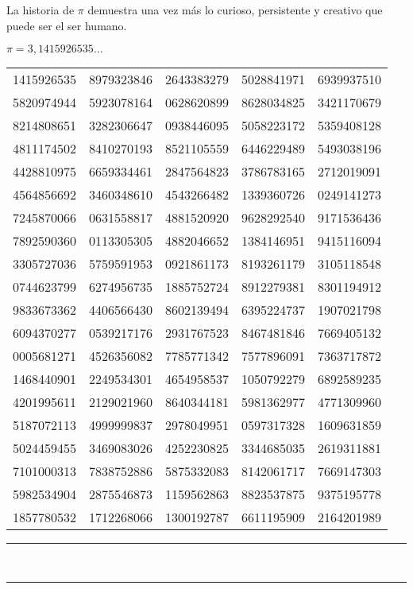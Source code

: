 La historia de $\pi$ demuestra una vez más lo curioso, persistente y creativo que puede ser el ser humano.

\begin{center}
\Large $\pi = 3,1415926535\ldots$
\end{center}

{%
\renewcommand{\arraystretch}{0.9}
\setlength{\tabcolsep}{0.6em}

\begin{center}
\begin{tabular}{ccccc}
1415926535 & 8979323846 & 2643383279 & 5028841971 & 6939937510 \\
5820974944 & 5923078164 & 0628620899 & 8628034825 & 3421170679 \\
8214808651 & 3282306647 & 0938446095 & 5058223172 & 5359408128 \\
4811174502 & 8410270193 & 8521105559 & 6446229489 & 5493038196 \\
4428810975 & 6659334461 & 2847564823 & 3786783165 & 2712019091 \\
4564856692 & 3460348610 & 4543266482 & 1339360726 & 0249141273 \\
7245870066 & 0631558817 & 4881520920 & 9628292540 & 9171536436 \\
7892590360 & 0113305305 & 4882046652 & 1384146951 & 9415116094 \\
3305727036 & 5759591953 & 0921861173 & 8193261179 & 3105118548 \\
0744623799 & 6274956735 & 1885752724 & 8912279381 & 8301194912 \\
9833673362 & 4406566430 & 8602139494 & 6395224737 & 1907021798 \\
6094370277 & 0539217176 & 2931767523 & 8467481846 & 7669405132 \\
0005681271 & 4526356082 & 7785771342 & 7577896091 & 7363717872 \\
1468440901 & 2249534301 & 4654958537 & 1050792279 & 6892589235 \\
4201995611 & 2129021960 & 8640344181 & 5981362977 & 4771309960 \\
5187072113 & 4999999837 & 2978049951 & 0597317328 & 1609631859 \\
5024459455 & 3469083026 & 4252230825 & 3344685035 & 2619311881 \\
7101000313 & 7838752886 & 5875332083 & 8142061717 & 7669147303 \\
5982534904 & 2875546873 & 1159562863 & 8823537875 & 9375195778 \\
1857780532 & 1712268066 & 1300192787 & 6611195909 & 2164201989 \\
\end{tabular}
\end{center}
}
\begin{center}
\noindent\rule{0.6\linewidth}{0.4pt}\\[-1.5ex]
\noindent\rule{0.6\linewidth}{0.4pt}
\end{center}

